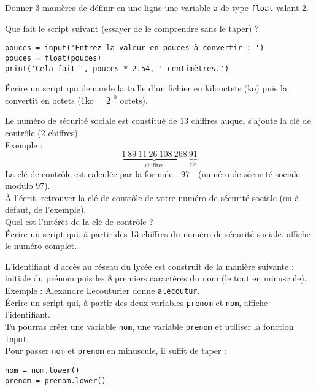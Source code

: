 \begin{exercice}
    Donner 3 manières de définir en une ligne une variable \texttt{a} de type \texttt{float} valant 2.
\end{exercice}

\begin{exercice}
    Que fait le script suivant (essayer de le comprendre sans le taper) ?
\begin{verbatim}
pouces = input('Entrez la valeur en pouces à convertir : ')
pouces = float(pouces)
print('Cela fait ', pouces * 2.54, ' centimètres.')
\end{verbatim}

    \'Ecrire un script qui demande la taille d'un fichier en kilooctets (ko) puis la convertit en octets (1ko = $2^{10}$ octets).
\end{exercice}
\begin{exercice}
    Le numéro de sécurité sociale est constitué de 13 chiffres auquel s'ajoute la clé de contrôle (2 chiffres).\\
    Exemple : $$\underbrace{1\ 89\ 11\ 26\ 108\ 268}_{\textrm{chiffres}}\ \underbrace{91}_{\textrm{clé}}$$
    La clé de contrôle est calculée par la formule : 97 - (numéro de sécurité sociale modulo 97).\\
    À l'écrit, retrouver la clé de contrôle de votre numéro de sécurité sociale (ou à défaut, de l'exemple).\\
    Quel est l'intérêt de la clé de contrôle ?\\
    \'Ecrire un script qui, à partir des 13 chiffres du numéro de sécurité sociale, affiche le numéro complet.
\end{exercice}
\begin{exercice}
    L'identifiant d'accès au réseau du lycée est construit de la manière suivante : initiale du prénom puis les 8 premiers caractères du nom (le tout en minuscule).\\
    Exemple : Alexandre Lecouturier donne \texttt{alecoutur}.\\
    \'Ecrire un script qui, à partir des deux variables \texttt{prenom} et \texttt{nom}, affiche l'identifiant.\\
    Tu pourras créer une variable \texttt{nom}, une variable \texttt{prenom} et utiliser la fonction \texttt{input}.\\
    Pour passer \texttt{nom} et \texttt{prenom} en minuscule, il suffit de taper :
    \begin{verbatim}
nom = nom.lower()
prenom = prenom.lower()
\end{verbatim}
\end{exercice}
